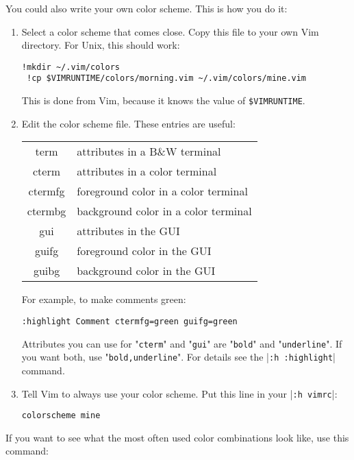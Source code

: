 You could also write your own color scheme.
This is how you do it:
\begin{enumerate}
				\item Select a color scheme that comes close.
								Copy this file to your own Vim directory.
								For Unix, this should work:

								\begin{Verbatim}[samepage=true]
 !mkdir ~/.vim/colors
 !cp $VIMRUNTIME/colors/morning.vim ~/.vim/colors/mine.vim
 \end{Verbatim}

								This is done from Vim, because it knows the value of \texttt{\$VIMRUNTIME}.

				\item Edit the color scheme file.
								These entries are useful:

								\begin{tabular}{c l}
												term & attributes in a B\&W terminal\\
												cterm & attributes in a color terminal\\
												ctermfg & foreground color in a color terminal\\
												ctermbg & background color in a color terminal\\
												gui & attributes in the GUI\\
												guifg & foreground color in the GUI\\
												guibg & background color in the GUI\\
								\end{tabular}

								For example, to make comments green:

								\begin{Verbatim}[samepage=true]
 :highlight Comment ctermfg=green guifg=green
								\end{Verbatim}

								Attributes you can use for "\texttt{cterm}" and "\texttt{gui}" are "\texttt{bold}" and "\texttt{underline}".
								If you want both, use "\texttt{bold,underline}".
								For details see the |\texttt{:h :highlight}| command.

				\item Tell Vim to always use your color scheme.
								Put this line in your |\texttt{:h vimrc}|:

								\begin{Verbatim}[samepage=true]
 colorscheme mine
 \end{Verbatim}

\end{enumerate}
If you want to see what the most often used color combinations look like, use this command:

